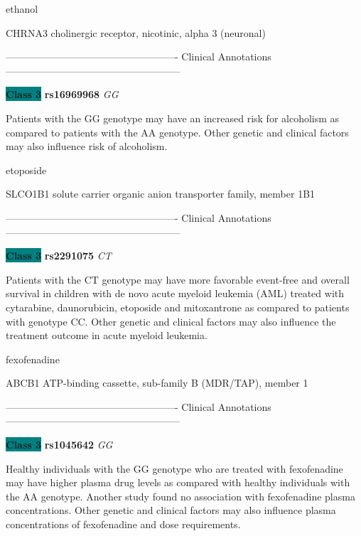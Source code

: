 \documentclass{resume} %
\begin{document}
\begin{rSection}{ ethanol }
\begin{rSubsection}{ CHRNA3 }{ cholinergic receptor, nicotinic, alpha 3 (neuronal) }{}{}
\item[] ---------------------------------------------------- Clinical Annotations -----------------------------------------------------\newline
\item \textbf{\colorbox{teal} {Class 3}} \textbf{ rs16969968 } \textit{ GG }
\item[] Patients with the GG genotype may have an increased risk for alcoholism as compared to patients with the AA genotype. Other genetic and clinical factors may also influence risk of alcoholism.
\end{rSubsection}

\end{rSection}\begin{rSection}{ etoposide }
\item[]

\begin{rSubsection}{ SLCO1B1 }{ solute carrier organic anion transporter family, member 1B1 }{}{}
\item[]

\item[] ---------------------------------------------------- Clinical Annotations -----------------------------------------------------\newline
\item \textbf{\colorbox{teal} {Class 3}} \textbf{ rs2291075 } \textit{ CT }
\item[] Patients with the CT genotype may have more favorable event-free and overall survival in children with de novo acute myeloid leukemia (AML) treated with cytarabine, daunorubicin, etoposide and mitoxantrone as compared to patients with genotype CC. Other genetic and clinical factors may also influence the treatment outcome in acute myeloid leukemia.
\end{rSubsection}

\end{rSection}\begin{rSection}{ fexofenadine }
\item[]

\begin{rSubsection}{ ABCB1 }{ ATP-binding cassette, sub-family B (MDR/TAP), member 1 }{}{}
\item[]

\item[] ---------------------------------------------------- Clinical Annotations -----------------------------------------------------\newline
\item \textbf{\colorbox{teal} {Class 3}} \textbf{ rs1045642 } \textit{ GG }
\item[] Healthy individuals with the GG genotype who are treated with fexofenadine may have higher plasma drug levels as compared with healthy individuals with the AA genotype. Another study found no association with fexofenadine plasma concentrations. Other genetic and clinical factors may also influence plasma concentrations of fexofenadine and dose requirements.
\end{rSubsection}


\end{rSection}
\end{document}
